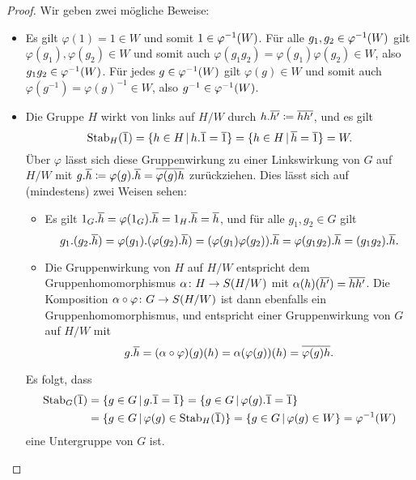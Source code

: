 \begin{proof}
  Wir geben zwei mögliche Beweise:
  \begin{itemize}
    \item
      Es gilt $\varphi(1) = 1 \in W$ und somit $1 \in \varphi^{-1}(W)$.
      Für alle $g_1, g_2 \in \varphi^{-1}(W)$ gilt $\varphi(g_1), \varphi(g_2) \in W$ und somit auch $\varphi(g_1 g_2) = \varphi(g_1)\varphi(g_2) \in W$, also $g_1 g_2 \in \varphi^{-1}(W)$.
      Für jedes $g \in \varphi^{-1}(W)$ gilt $\varphi(g) \in W$ und somit auch $\varphi(g^{-1}) = \varphi(g)^{-1} \in W$, also $g^{-1} \in \varphi^{-1}(W)$.
    
    \item
      Die Gruppe $H$ wirkt von links auf $H/W$ durch $h.\overline{h'} \coloneqq \overline{hh'}$, und es gilt
      \[
          \stab{H}{\class{1}}
        = \{ h \in H \suchthat h.\class{1} = \class{1} \}
        = \{ h \in H \suchthat \class{h} = \class{1} \}
        = W.
      \]
      Über $\varphi$ lässt sich diese Gruppenwirkung zu einer Linkswirkung von $G$ auf $H/W$ mit $g.\overline{h} \coloneqq \varphi(g).\overline{h} = \overline{\varphi(g)h}$ zurückziehen.
      Dies lässt sich auf (mindestens) zwei Weisen sehen:
      
      \begin{itemize}
        \item
          Es gilt $1_G.\overline{h} = \varphi(1_G).\overline{h} = 1_H.\overline{h} = \overline{h}$, und für alle $g_1, g_2 \in G$ gilt
          \[
              g_1.(g_2.\overline{h})
            = \varphi(g_1).(\varphi(g_2).\overline{h})
            = (\varphi(g_1) \varphi(g_2)).\overline{h}
            = \varphi(g_1 g_2).\overline{h}
            = (g_1 g_2).\overline{h}.
          \]
        \item
          Die Gruppenwirkung von $H$ auf $H/W$ entspricht dem Gruppenhomomorphismus $\alpha \colon H \to S(H/W)$ mit $\alpha(h)(\overline{h'}) = \overline{h h'}$.
          Die Komposition $\alpha \circ \varphi \colon G \to S(H/W)$ ist dann ebenfalls ein Gruppenhomomorphismus, und entspricht einer Gruppenwirkung von $G$ auf $H/W$ mit
          \[
              g.\overline{h}
            = (\alpha \circ \varphi)(g)(h)
            = \alpha(\varphi(g))(h)
            = \overline{\varphi(g) h}.
          \]
      \end{itemize}
      Es folgt, dass
      \begin{align*}
            \stab{G}{\class{1}}
        &=  \{ g \in G \suchthat g.\class{1} = \class{1} \}
         =  \{ g \in G \suchthat \varphi(g).\class{1} = \class{1} \}
        \\
        &=  \{ g \in G \suchthat \varphi(g) \in \stab{H}{\class{1}} \}
         =  \{ g \in G \suchthat \varphi(g) \in W \}
         =  \preim{\varphi}{W}
      \end{align*}
      eine Untergruppe von $G$ ist.
    \qedhere
  \end{itemize}
\end{proof}


